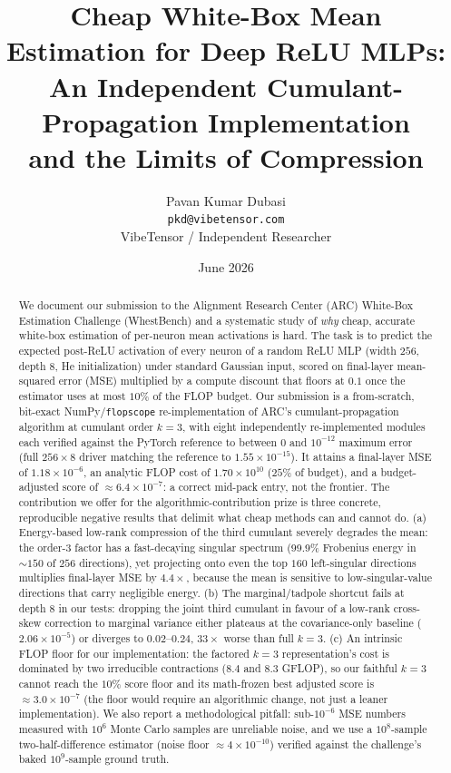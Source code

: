 \documentclass[11pt]{article}
\title{\textbf{Cheap White-Box Mean Estimation for Deep ReLU MLPs:\\
An Independent Cumulant-Propagation Implementation\\
and the Limits of Compression}}
\author{
Pavan Kumar Dubasi\\
\texttt{pkd@vibetensor.com}\\
VibeTensor / Independent Researcher
}
\date{June 2026}
\theoremstyle{remark}
\begin{document}
\maketitle

\begin{abstract}
We document our submission to the Alignment Research Center (ARC) White-Box
Estimation Challenge (WhestBench) and a systematic study of \emph{why} cheap,
accurate white-box estimation of per-neuron mean activations is hard. The task
is to predict the expected post-ReLU activation of every neuron of a random
ReLU MLP (width $256$, depth $8$, He initialization) under standard Gaussian
input, scored on final-layer mean-squared error (MSE) multiplied by a compute
discount that floors at $0.1$ once the estimator uses at most $10\%$ of the FLOP
budget. Our submission is a from-scratch, bit-exact NumPy/\texttt{flopscope}
re-implementation of ARC's cumulant-propagation algorithm at cumulant order
$k=3$, with eight independently re-implemented modules each verified against the
PyTorch reference to between $0$ and $10^{-12}$ maximum error (full $256\times8$
driver matching the reference to $1.55\times10^{-15}$). It attains a final-layer
MSE of $1.18\times10^{-6}$, an analytic FLOP cost of $1.70\times10^{10}$ ($25\%$
of budget), and a budget-adjusted score of $\approx 6.4\times10^{-7}$: a correct
mid-pack entry, not the frontier. The contribution we offer for the
algorithmic-contribution prize is three concrete, reproducible negative
results that delimit what cheap methods can and cannot do. (a) Energy-based
low-rank compression of the third cumulant severely degrades the mean: the
order-3 factor has a fast-decaying singular spectrum (99.9\% Frobenius energy in
$\sim\!150$ of $256$ directions), yet projecting onto even the top $160$
left-singular directions multiplies final-layer MSE by $4.4\times$, because the
mean is sensitive to low-singular-value directions that carry negligible energy.
(b) The marginal/tadpole shortcut fails at depth $8$ in our tests: dropping the
joint third cumulant in favour of a low-rank cross-skew correction to marginal
variance either plateaus at the covariance-only baseline ($2.06\times10^{-5}$)
or diverges to $0.02$--$0.24$, $33\times$ worse than full $k{=}3$. (c) An
intrinsic FLOP floor for our implementation: the factored $k{=}3$
representation's cost is dominated by two irreducible contractions ($8.4$ and
$8.3$ GFLOP), so our faithful $k{=}3$ cannot reach the $10\%$ score floor and
its math-frozen best adjusted score is $\approx 3.0\times10^{-7}$ (the floor
would require an algorithmic change, not just a leaner implementation).
We also report a methodological pitfall: sub-$10^{-6}$ MSE numbers measured with
$10^6$ Monte Carlo samples are unreliable noise, and we use a
$10^8$-sample two-half-difference estimator (noise floor $\approx 4\times
10^{-10}$) verified against the challenge's baked $10^9$-sample ground truth.
\end{abstract}
\end{document}
